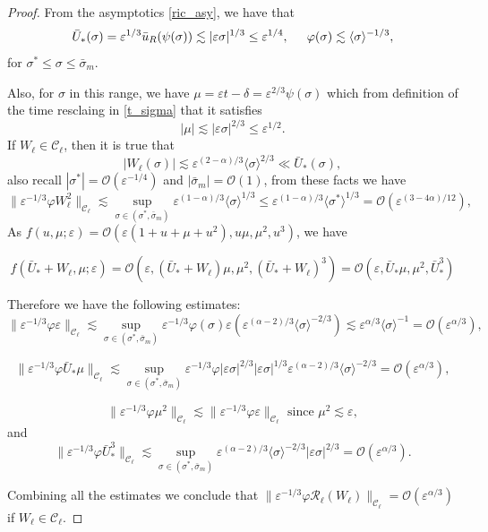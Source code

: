 \documentclass[letterpaper,11pt]{article}
\newcommand{\rmO}{\mathcal{O}}
\newcommand{\eps}{\varepsilon}
\newcommand{\lar}{ \lesssim }
\numberwithin{equation}{section}
\theoremstyle{plain}
\begin{document}
\begin{proof}
From the asymptotics \eqref{ric_asy}, we have that
\[
\bar{U}_*(\sigma) = \eps^{1/3} \bar{u}_R(\psi(\sigma)) \lar |\eps \sigma|^{1/3}\le \eps^{1/4}, \hspace{0.2in} \varphi(\sigma) \lar \langle\sigma\rangle^{-1/3} ,
\]
for $\sigma^*\le \sigma \le \bar{\sigma}_m$.

Also, for $\sigma$ in this range, we have $\mu = \eps t -\delta = \eps^{2/3}\psi(\sigma)$ which from definition of the time resclaing in \ref{t_sigma}  that it satisfies
\[
|\mu| \lar |\eps \sigma|^{2/3} \le \eps^{1/2}.
\]
If $W_\ell \in \mathcal{C}_\ell$, then it is true that
\[
|W_\ell(\sigma)| \lar \eps^{(2-\alpha)/3} \langle \sigma \rangle^{2/3} \ll \bar{U}_*(\sigma), 
\]
also recall $|\sigma^*| = \rmO(\eps^{-1/4})$ and $|\bar{\sigma}_m| = \rmO(1)$, from these facts we have
\[
\|\eps^{-1/3}\varphi W_\ell^2\|_{\mathcal{C}_\ell} \lar \sup_{\sigma \in (\sigma^{*},\bar{\sigma}_m)} \eps^{(1-\alpha)/3}\langle \sigma\rangle^{1/3}  \le \eps^{(1-\alpha)/3} \langle \sigma^{*} \rangle^{1/3} = \rmO(\eps^{(3-4\alpha)/12}),
\]
As $f(u,\mu; \eps) = \rmO(\eps(1+u+\mu+u^2),u\mu,\mu^2,u^3)$, we have

\[
f(\bar{U}_*+W_\ell, \mu ;\eps) = \rmO(\eps, (\bar{U}_*+W_\ell)\mu, \mu^2, (\bar{U}_*+W_\ell)^3 ) = \rmO(\eps, \bar{U}_*\mu, \mu^2, \bar{U}_*^3)
\]

Therefore we have the following estimates:
\[
\|\eps^{-1/3}\varphi \eps \|_{\mathcal{C}_\ell} \lar \sup_{\sigma \in (\sigma^{*},\bar{\sigma}_m)} \eps^{-1/3} \varphi(\sigma) \eps (\eps^{(\alpha-2)/3}\langle \sigma\rangle^{-2/3}) \lar \eps^{\alpha/3} \langle\sigma\rangle^{-1} =\rmO(\eps^{\alpha/3}),
\]

\[
\|\eps^{-1/3}\varphi \bar{U}_*\mu \|_{\mathcal{C}_\ell} \lar \sup_{\sigma \in (\sigma^{*},\bar{\sigma}_m)} \eps^{-1/3}\varphi |\eps\sigma|^{2/3}|\eps\sigma|^{1/3}\eps^{(\alpha-2)/3}\langle \sigma\rangle^{-2/3}  = \rmO(\eps^{\alpha/3}),
\]

\[
\|\eps^{-1/3}\varphi \mu^2 \|_{\mathcal{C}_\ell} \lar \|\eps^{-1/3}\varphi \eps \|_{\mathcal{C}_\ell} \text{ since } \mu^2 \lar \eps,
\]
and 
\[
\|\eps^{-1/3}\varphi \bar{U}_*^3 \|_{\mathcal{C}_\ell}  \lar \sup_{\sigma \in (\sigma^{*},\bar{\sigma}_m)}\eps^{(\alpha-2)/3}\langle \sigma\rangle^{-2/3} |\eps \sigma|^{2/3} = \rmO(\eps^{\alpha/3}).
\]

Combining all the estimates we conclude that $\|\eps^{-1/3}\varphi \mathcal{R}_\ell(W_\ell)\|_{\mathcal{C}_\ell} = \rmO(\eps^{\alpha/3})$ if $W_\ell \in \mathcal{C}_\ell$.
\end{proof}
\end{document}
